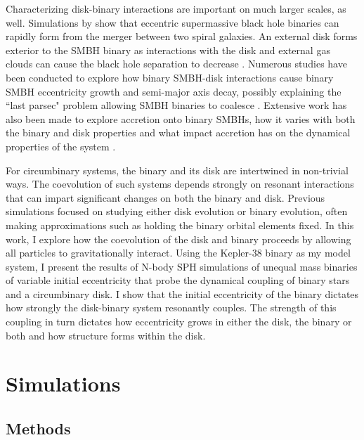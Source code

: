 Characterizing disk-binary interactions are important on much larger scales, as well.  Simulations by \citet{Mayer2007} show that eccentric supermassive
black hole binaries can rapidly form from the merger between two spiral galaxies.  An external disk forms exterior to the SMBH binary
as interactions with the disk and external gas clouds can cause the black hole separation to decrease \citep{Roskar2015}.  Numerous studies have been 
conducted to explore how binary SMBH-disk interactions cause binary SMBH eccentricity growth and semi-major axis decay, possibly 
explaining the ``last parsec" problem allowing SMBH binaries to coalesce \citep[e.g.][]{Armitage2005,Escala2005,Cuadra2009,Roedig2012,Aly2015}.  Extensive work
has also been made to explore accretion onto binary SMBHs, how it varies with both the binary and disk properties and what impact accretion
has on the dynamical properties of the system \citep[e.g.][]{Shi2012,DOrazio2013,Nixon2013,Farris2014}.
 
For circumbinary systems, the binary and its disk are intertwined in
non-trivial ways.  The coevolution of such systems depends strongly on
resonant interactions that can impart significant changes on both the
binary and disk.  Previous simulations focused on studying either disk evolution or binary evolution, often making approximations
such as holding the binary orbital elements fixed.  In this work, I explore how the coevolution
of the disk and binary proceeds by allowing all particles to gravitationally interact.  
Using the Kepler-38 binary as my model system, I present the results of N-body
SPH simulations of unequal mass binaries of variable initial eccentricity 
that probe the dynamical coupling of binary stars and a circumbinary disk.  
I show that the initial eccentricity of the binary dictates how strongly the disk-binary system resonantly couples.
The strength of this coupling in turn dictates how eccentricity grows in either the disk, the binary or both and how structure 
forms within the disk.

\section{Simulations}

\subsection{Methods} \label{CBDisk:sec:methods_section}

